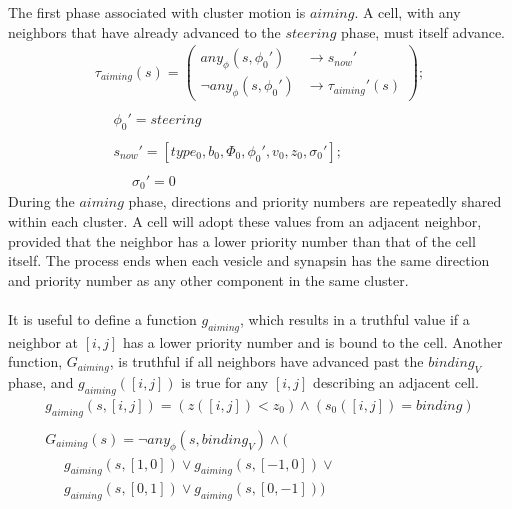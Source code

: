 \documentclass{acm_proc_article-sp}
\begin{document}
The first phase associated with cluster motion is
$aiming$.  A cell, with any neighbors
that have already advanced to the $steering$ phase,
must itself advance.
\begin{displaymath} \begin{array}{l}
\tau_{aiming}(s) = \left( \begin{array}{ll} any_\phi(s, \phi_0')      & \rightarrow s_{now}' \\
                                            \neg any_\phi(s, \phi_0') & \rightarrow \tau_{aiming}'(s) \end{array} \right); \\
\\
\hspace{16pt} \phi_0' = steering \\
\\
\hspace{16pt} s_{now}' = [type_0, b_0, \Phi_0, \phi_0', v_0, z_0, \sigma_0']; \\
\\
\hspace{16pt} \hspace{16pt} \sigma_0' = 0
\end{array} \end{displaymath}
During the $aiming$ phase, directions and priority numbers 
are repeatedly shared within each cluster.  A cell will 
adopt these values from an adjacent neighbor, provided that
the neighbor has a lower priority number than that of the
cell itself.  The process ends when each vesicle and 
synapsin has the same direction and priority number as any 
other component in the same cluster.  \\
\\
It is useful to define a function $g_{aiming}$, which results 
in a truthful value if a neighbor at $[i, j]$ has a lower
priority number and is bound to the cell.  Another function,
$G_{aiming}$, is truthful if all neighbors have advanced past
the $binding_V$ phase, and $g_{aiming}([i, j])$ is true for
any $[i, j]$ describing an adjacent cell.
\begin{displaymath} \begin{array}{l}
g_{aiming}(s, [i, j]) = (z([i, j]) < z_0) \wedge (s_0([i, j]) = binding) \\
\\
G_{aiming}(s) = \neg any_{\phi}(s, binding_V) \wedge ( \\
\hspace{16pt} g_{aiming}(s, [1, 0]) \vee g_{aiming}(s, [-1, 0]) \vee \\
\hspace{16pt} g_{aiming}(s, [0, 1]) \vee g_{aiming}(s, [0, -1]))
\end{array} \end{displaymath}
\end{document}

